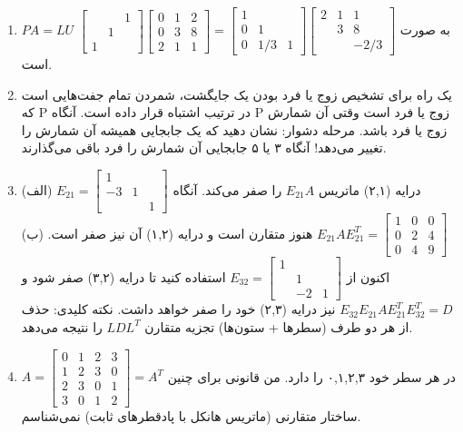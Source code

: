 \documentclass[12pt,a4paper]{article}
\begin{document}
{\begin{enumerate}
			\item $PA=LU$ به صورت $\begin{bmatrix} & & 1 \\ & 1 & \\ 1 & & \end{bmatrix} \begin{bmatrix} 0 & 1 & 2 \\ 0 & 3 & 8 \\ 2 & 1 & 1 \end{bmatrix} = \begin{bmatrix} 1 & & \\ 0 & 1 & \\ 0 & 1/3 & 1 \end{bmatrix} \begin{bmatrix} 2 & 1 & 1 \\ & 3 & 8 \\ & & -2/3 \end{bmatrix}$ است.
			
			\item یک راه برای تشخیص زوج یا فرد بودن یک جایگشت، شمردن تمام جفت‌هایی است که P در ترتیب اشتباه قرار داده است. آنگاه P زوج یا فرد است وقتی آن شمارش زوج یا فرد باشد. مرحله دشوار: نشان دهید که یک جابجایی همیشه آن شمارش را تغییر می‌دهد! آنگاه ۳ یا ۵ جابجایی آن شمارش را فرد باقی می‌گذارند.
			
			\item (الف) $E_{21} = \begin{bmatrix} 1 & & \\ -3 & 1 & \\ & & 1 \end{bmatrix}$ درایه (۲,۱) ماتریس $E_{21}A$ را صفر می‌کند. آنگاه $E_{21}AE_{21}^T = \begin{bmatrix} 1 & 0 & 0 \\ 0 & 2 & 4 \\ 0 & 4 & 9 \end{bmatrix}$ هنوز متقارن است و درایه (۱,۲) آن نیز صفر است.
			(ب) اکنون از $E_{32} = \begin{bmatrix} 1 & & \\ & 1 & \\ & -2 & 1 \end{bmatrix}$ استفاده کنید تا درایه (۳,۲) صفر شود و $E_{32}E_{21}AE_{21}^T E_{32}^T = D$ نیز درایه (۲,۳) خود را صفر خواهد داشت. نکته کلیدی: حذف از هر دو طرف (سطرها + ستون‌ها) تجزیه متقارن $LDL^T$ را نتیجه می‌دهد.
			
			\item $A = \begin{bmatrix} 0 & 1 & 2 & 3 \\ 1 & 2 & 3 & 0 \\ 2 & 3 & 0 & 1 \\ 3 & 0 & 1 & 2 \end{bmatrix} = A^T$ در هر سطر خود ۰,۱,۲,۳ را دارد. من قانونی برای چنین ساختار متقارنی (ماتریس هانکل با پادقطرهای ثابت) نمی‌شناسم.
		\end{enumerate}
		
}
\end{document}
